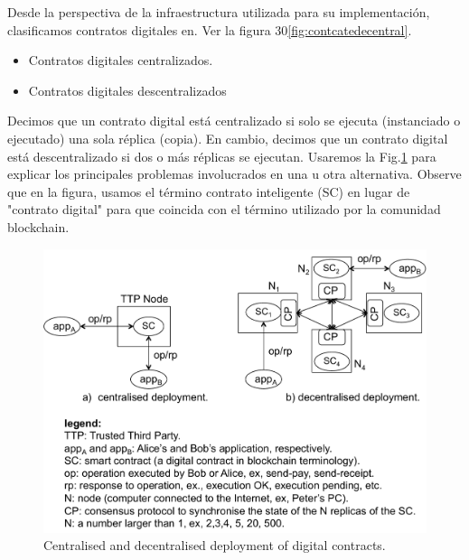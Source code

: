 \documentclass[12pt]{report} %
\begin{document}
Desde la perspectiva de la infraestructura utilizada para su implementación, clasificamos contratos digitales en. Ver la figura 30\ref{fig:contcatedecentral}.

\begin{itemize}
    
    \item Contratos digitales centralizados.

    \item Contratos digitales descentralizados

   
\end{itemize}

Decimos que un contrato digital está centralizado si solo se ejecuta (instanciado o ejecutado) una sola réplica (copia). En cambio, decimos que un contrato digital está descentralizado si dos o más réplicas se ejecutan. Usaremos la Fig.\ref{fig:concentdecentdeploy} para explicar los principales problemas involucrados en una u otra alternativa. Observe que en la figura, usamos el término contrato inteligente (SC) en lugar de "contrato digital" para que coincida con el término utilizado por la comunidad blockchain.





\begin{figure}
\centering
\includegraphics[width=0.78\columnwidth]{figures/contcentdecentdeploy.pdf}
\caption{Centralised and decentralised deployment of digital contracts.}
\label{fig:concentdecentdeploy}
\end{figure}
\end{document}
